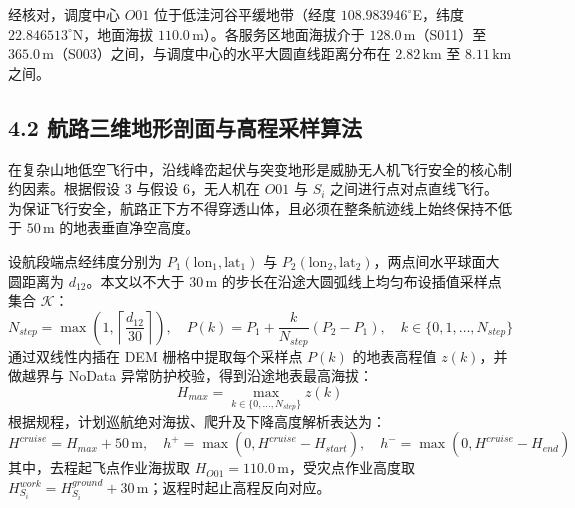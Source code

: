 \documentclass[12pt,a4paper,UTF8]{ctexart}
\begin{document}
经核对，调度中心 $O01$ 位于低洼河谷平缓地带（经度 $108.983946^\circ$E，纬度 $22.846513^\circ$N，地面海拔 $110.0\,\text{m}$）。各服务区地面海拔介于 $128.0\,\text{m}$（S011）至 $365.0\,\text{m}$（S003）之间，与调度中心的水平大圆直线距离分布在 $2.82\,\text{km}$ 至 $8.11\,\text{km}$ 之间。

\subsection{4.2 航路三维地形剖面与高程采样算法}
在复杂山地低空飞行中，沿线峰峦起伏与突变地形是威胁无人机飞行安全的核心制约因素\cite{roberge2013}。根据假设 3 与假设 6，无人机在 $O01$ 与 $S_i$ 之间进行点对点直线飞行。为保证飞行安全，航路正下方不得穿透山体，且必须在整条航迹线上始终保持不低于 $50\,\text{m}$ 的地表垂直净空高度。

设航段端点经纬度分别为 $P_1(\text{lon}_1, \text{lat}_1)$ 与 $P_2(\text{lon}_2, \text{lat}_2)$，两点间水平球面大圆距离为 $d_{12}$。本文以不大于 $30\,\text{m}$ 的步长在沿途大圆弧线上均匀布设插值采样点集合 $\mathcal{K}$：
\begin{equation}
N_{step} = \max\left(1, \left\lceil \frac{d_{12}}{30} \right\rceil\right), \quad P(k) = P_1 + \frac{k}{N_{step}} (P_2 - P_1), \quad k \in \{0, 1, \dots, N_{step}\}
\end{equation}
通过双线性内插在 DEM 栅格中提取每个采样点 $P(k)$ 的地表高程值 $z(k)$，并做越界与 NoData 异常防护校验，得到沿途地表最高海拔：
\begin{equation}
H_{max} = \max_{k \in \{0, \dots, N_{step}\}} z(k)
\end{equation}
根据规程，计划巡航绝对海拔、爬升及下降高度解析表达为：
\begin{equation}
H^{cruise} = H_{max} + 50\,\text{m}, \quad h^+ = \max(0, H^{cruise} - H_{start}), \quad h^- = \max(0, H^{cruise} - H_{end})
\end{equation}
其中，去程起飞点作业海拔取 $H_{O01} = 110.0\,\text{m}$，受灾点作业高度取 $H_{S_i}^{work} = H_{S_i}^{ground} + 30\,\text{m}$；返程时起止高程反向对应。
\end{document}
